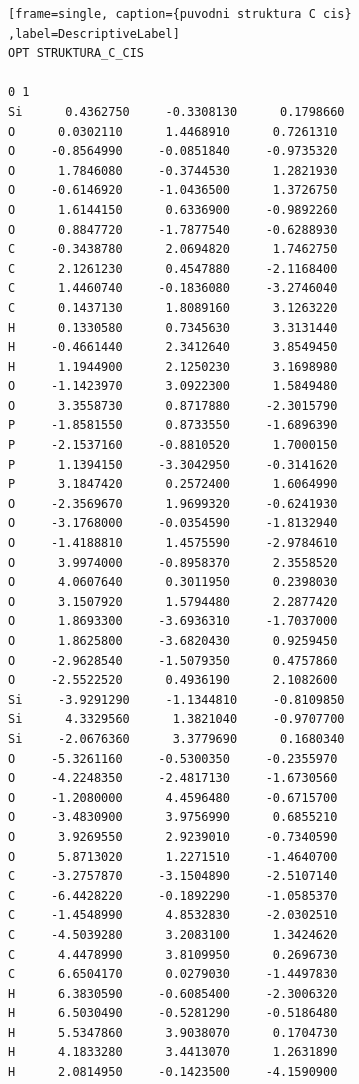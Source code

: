 \documentclass[
digital, %
table,   %
lof,     %
lot,     %
oneside,
]{fithesis3}
\begin{document}
\newpage

\begin{lstlisting}[frame=single, caption={puvodni struktura C cis} ,label=DescriptiveLabel]
OPT STRUKTURA_C_CIS

0 1
Si      0.4362750     -0.3308130      0.1798660
O      0.0302110      1.4468910      0.7261310
O     -0.8564990     -0.0851840     -0.9735320
O      1.7846080     -0.3744530      1.2821930
O     -0.6146920     -1.0436500      1.3726750
O      1.6144150      0.6336900     -0.9892260
O      0.8847720     -1.7877540     -0.6288930
C     -0.3438780      2.0694820      1.7462750
C      2.1261230      0.4547880     -2.1168400
C      1.4460740     -0.1836080     -3.2746040
C      0.1437130      1.8089160      3.1263220
H      0.1330580      0.7345630      3.3131440
H     -0.4661440      2.3412640      3.8549450
H      1.1944900      2.1250230      3.1698980
O     -1.1423970      3.0922300      1.5849480
O      3.3558730      0.8717880     -2.3015790
P     -1.8581550      0.8733550     -1.6896390
P     -2.1537160     -0.8810520      1.7000150
P      1.1394150     -3.3042950     -0.3141620
P      3.1847420      0.2572400      1.6064990
O     -2.3569670      1.9699320     -0.6241930
O     -3.1768000     -0.0354590     -1.8132940
O     -1.4188810      1.4575590     -2.9784610
O      3.9974000     -0.8958370      2.3558520
O      4.0607640      0.3011950      0.2398030
O      3.1507920      1.5794480      2.2877420
O      1.8693300     -3.6936310     -1.7037000
O      1.8625800     -3.6820430      0.9259450
O     -2.9628540     -1.5079350      0.4757860
O     -2.5522520      0.4936190      2.1082600
Si     -3.9291290     -1.1344810     -0.8109850
Si      4.3329560      1.3821040     -0.9707700
Si     -2.0676360      3.3779690      0.1680340
O     -5.3261160     -0.5300350     -0.2355970
O     -4.2248350     -2.4817130     -1.6730560
O     -1.2080000      4.4596480     -0.6715700
O     -3.4830900      3.9756990      0.6855210
O      3.9269550      2.9239010     -0.7340590
O      5.8713020      1.2271510     -1.4640700
C     -3.2757870     -3.1504890     -2.5107140
C     -6.4428220     -0.1892290     -1.0585370
C     -1.4548990      4.8532830     -2.0302510
C     -4.5039280      3.2083100      1.3424620
C      4.4478990      3.8109950      0.2696730
C      6.6504170      0.0279030     -1.4497830
H      6.3830590     -0.6085400     -2.3006320
H      6.5030490     -0.5281290     -0.5186480
H      5.5347860      3.9038070      0.1704730
H      4.1833280      3.4413070      1.2631890
H      2.0814950     -0.1423500     -4.1590900

\end{lstlisting}
\end{document}
